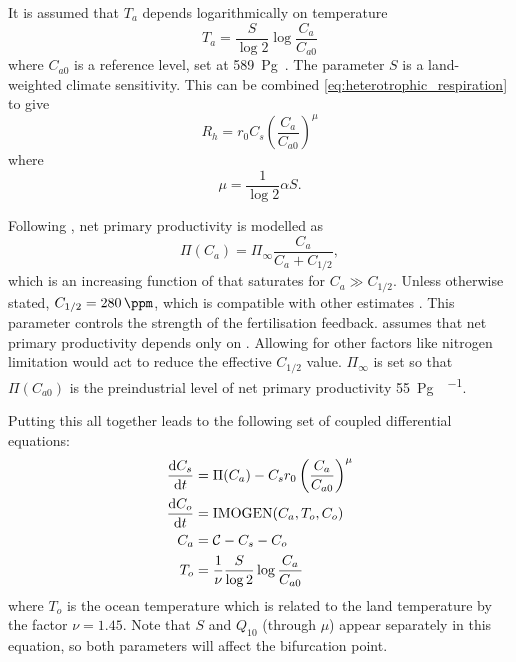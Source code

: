 It is assumed that $T_a$ depends logarithmically on temperature
\begin{equation}
  \label{eq:air_temperature}
  T_a = \frac{S}{\log 2} \log \frac{C_a}{C_{a0}}
\end{equation}
where $C_{a0}$ is a reference  level, set at \SI{589}{\peta\gram\carbon}. The parameter $S$ is a land-weighted climate sensitivity. This can be combined \cref{eq:heterotrophic_respiration}
to give
\begin{equation}
  \label{eq:heterotrophic_respiration_combined}
  R_h = r_0 C_s \left( \frac{C_a}{C_{a0}}\right)^{\mu}
\end{equation}
where
\begin{equation}
  \label{eq:mu}
  \mu = \frac{1}{\log 2} \alpha S.
\end{equation}


Following \cite{Cox2006}, net primary productivity is modelled as
\begin{equation}
  \label{eq:npp}
  \Pi(C_a) = \Pi_{\infty}\frac{C_a}{C_a + C_{1/2}},
\end{equation}
which is an increasing function of  that saturates for $C_a \gg C_{1/2}$. Unless otherwise stated, $C_{1/2} = \SI{280}{\ppm}$, which is compatible with other estimates
\parencite{KolbySmith2016,Wenzel2016}. This parameter controls the strength of the  fertilisation feedback.  assumes that net primary productivity depends only
on . Allowing for other factors like nitrogen limitation would act to reduce the effective $C_{1/2}$ value. $\Pi_{\infty}$ is set so that $\Pi(C_{a0})$ is the preindustrial
level of net primary productivity \SI{55}{\peta\gram\carbon\per\year}.

Putting this all together leads to the following set of coupled differential equations:
\begin{subequations}
  \label{eq:imogen_deterministic}
  \begin{align}
    \dv{C_s}{t}     &= \Pi(C_a) - C_s r_0 \left(\frac{C_a}{C_{a0}}\right)^\mu \\
    \dv{C_o}{t}     &= \mathrm{IMOGEN}(C_a,T_o,C_o) \\
    C_a             &= \mathcal{C} - C_s - C_o \\
    T_o             &= \frac{1}{\nu}\frac{S}{\log 2}\log \frac{C_a}{C_{a0}}
  \end{align}
\end{subequations}
where $T_o$ is the ocean temperature which is related to the land temperature by the factor $\nu = 1.45$. Note that $S$ and $Q_{10}$ (through $\mu$) appear separately in this equation,
so both parameters will affect the bifurcation point.

